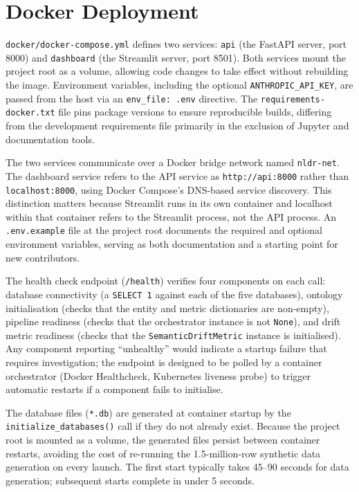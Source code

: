 \documentclass[12pt,a4paper]{report}
\begin{document}
\section{Docker Deployment}
\label{sec:docker-impl}

\texttt{docker/docker-compose.yml} defines two services: \texttt{api} (the FastAPI server, port 8000) and \texttt{dashboard} (the Streamlit server, port 8501). Both services mount the project root as a volume, allowing code changes to take effect without rebuilding the image. Environment variables, including the optional \texttt{ANTHROPIC\_API\_KEY}, are passed from the host via an \texttt{env\_file: .env} directive. The \texttt{requirements-docker.txt} file pins package versions to ensure reproducible builds, differing from the development requirements file primarily in the exclusion of Jupyter and documentation tools.

The two services communicate over a Docker bridge network named \texttt{nldr-net}. The dashboard service refers to the \ac{API} service as \texttt{http://api:8000} rather than \texttt{localhost:8000}, using Docker Compose's DNS-based service discovery. This distinction matters because Streamlit runs in its own container and localhost within that container refers to the Streamlit process, not the \ac{API} process. An \texttt{.env.example} file at the project root documents the required and optional environment variables, serving as both documentation and a starting point for new contributors.

The health check endpoint (\texttt{/health}) verifies four components on each call: database connectivity (a \texttt{SELECT 1} against each of the five databases), ontology initialisation (checks that the entity and metric dictionaries are non-empty), pipeline readiness (checks that the orchestrator instance is not \texttt{None}), and drift metric readiness (checks that the \texttt{SemanticDriftMetric} instance is initialised). Any component reporting ``unhealthy'' would indicate a startup failure that requires investigation; the endpoint is designed to be polled by a container orchestrator (Docker Healthcheck, Kubernetes liveness probe) to trigger automatic restarts if a component fails to initialise.

The database files (\texttt{*.db}) are generated at container startup by the \texttt{initialize\_databases()} call if they do not already exist. Because the project root is mounted as a volume, the generated files persist between container restarts, avoiding the cost of re-running the 1.5-million-row synthetic data generation on every launch. The first start typically takes 45--90 seconds for data generation; subsequent starts complete in under 5 seconds.
\end{document}
